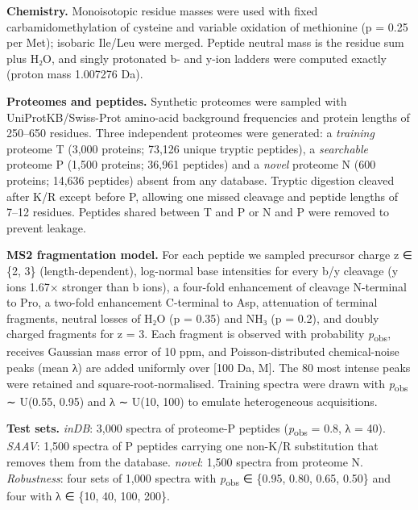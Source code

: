 \documentclass[
]{article}
\begin{document}
\textbf{Chemistry.} Monoisotopic residue masses were used with fixed
carbamidomethylation of cysteine and variable oxidation of methionine (p
= 0.25 per Met); isobaric Ile/Leu were merged. Peptide neutral mass is
the residue sum plus H₂O, and singly protonated b- and y-ion ladders
were computed exactly (proton mass 1.007276 Da).

\textbf{Proteomes and peptides.} Synthetic proteomes were sampled with
UniProtKB/Swiss-Prot amino-acid background frequencies and protein
lengths of 250--650 residues. Three independent proteomes were
generated: a \emph{training} proteome T (3,000 proteins; 73,126 unique
tryptic peptides), a \emph{searchable} proteome P (1,500 proteins;
36,961 peptides) and a \emph{novel} proteome N (600 proteins; 14,636
peptides) absent from any database. Tryptic digestion cleaved after K/R
except before P, allowing one missed cleavage and peptide lengths of
7--12 residues. Peptides shared between T and P or N and P were removed
to prevent leakage.

\textbf{MS2 fragmentation model.} For each peptide we sampled precursor
charge z ∈ \{2, 3\} (length-dependent), log-normal base intensities for
every b/y cleavage (y ions 1.67× stronger than b ions), a four-fold
enhancement of cleavage N-terminal to Pro, a two-fold enhancement
C-terminal to Asp, attenuation of terminal fragments, neutral losses of
H₂O (p = 0.35) and NH₃ (p = 0.2), and doubly charged fragments for z =
3. Each fragment is observed with probability
\emph{p}\textsubscript{obs}, receives Gaussian mass error of 10 ppm, and
Poisson-distributed chemical-noise peaks (mean λ) are added uniformly
over {[}100 Da, M{]}. The 80 most intense peaks were retained and
square-root-normalised. Training spectra were drawn with
\emph{p}\textsubscript{obs} ∼ U(0.55, 0.95) and λ ∼ U(10, 100) to
emulate heterogeneous acquisitions.

\textbf{Test sets.} \emph{inDB}: 3,000 spectra of proteome-P peptides
(\emph{p}\textsubscript{obs} = 0.8, λ = 40). \emph{SAAV}: 1,500 spectra
of P peptides carrying one non-K/R substitution that removes them from
the database. \emph{novel}: 1,500 spectra from proteome N.
\emph{Robustness}: four sets of 1,000 spectra with
\emph{p}\textsubscript{obs} ∈ \{0.95, 0.80, 0.65, 0.50\} and four with λ
∈ \{10, 40, 100, 200\}.
\end{document}
